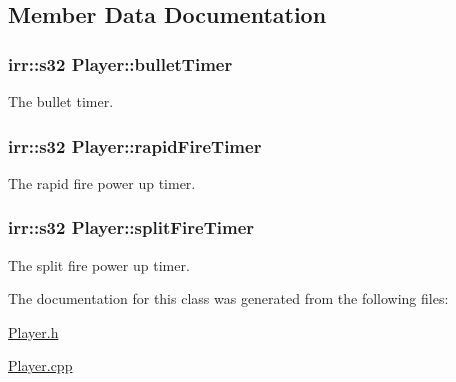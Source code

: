 \subsection{Member Data Documentation}
\hypertarget{class_player_a828317741fa8c7ff58ecbdb556ac092d}{
\subsubsection[{bullet\-Timer}]{\setlength{\rightskip}{0pt plus 5cm}irr\-::s32 Player\-::bullet\-Timer\hspace{0.3cm}{\ttfamily [private]}}}\label{class_player_a828317741fa8c7ff58ecbdb556ac092d}


The bullet timer. 

\hypertarget{class_player_ae4a6fe92f607de702ec714383324525f}{
\subsubsection[{rapid\-Fire\-Timer}]{\setlength{\rightskip}{0pt plus 5cm}irr\-::s32 Player\-::rapid\-Fire\-Timer\hspace{0.3cm}{\ttfamily [private]}}}\label{class_player_ae4a6fe92f607de702ec714383324525f}


The rapid fire power up timer. 

\hypertarget{class_player_a0d99bf8e9ae2d6e2079407a1686fc3a3}{
\subsubsection[{split\-Fire\-Timer}]{\setlength{\rightskip}{0pt plus 5cm}irr\-::s32 Player\-::split\-Fire\-Timer\hspace{0.3cm}{\ttfamily [private]}}}\label{class_player_a0d99bf8e9ae2d6e2079407a1686fc3a3}


The split fire power up timer. 



The documentation for this class was generated from the following files\-:\begin{DoxyCompactItemize}
\item 
\hyperlink{_player_8h}{Player.\-h}\item 
\hyperlink{_player_8cpp}{Player.\-cpp}\end{DoxyCompactItemize}
